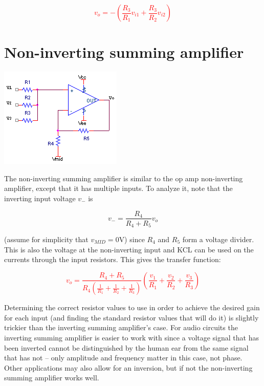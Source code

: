 \textcolor{red}{
\begin{equation}
v_{o} = -\left(\frac{R_{3}}{R_{1}}v_{i1} + \frac{R_{3}}{R_{2}}v_{i2}\right)
\label{eq:invertingsummingamplifier}
\end{equation}
}


\section{Non-inverting summing amplifier}
\begin{center}
	\includegraphics{schematics/summingamp.PNG}
\end{center}
The non-inverting summing amplifier is similar to the op amp non-inverting amplifier, except that it has multiple inputs. To analyze it, note that the inverting input voltage $v_{-}$ is

\begin{equation}
v_{-} = \frac{R_{4}}{R_{4}+R_{5}}v_{o}
\end{equation}

\noindent (assume for simplicity that $v_{MID} = 0$V) since $R_{4}$ and $R_{5}$ form a voltage divider. This is also the voltage at the non-inverting input and KCL can be used on the currents through the input resistors. This gives the transfer function:

\textcolor{red}{
\begin{equation}
v_{o} = \frac{R_{4}+R_{5}}{R_{4}\left(\frac{1}{R_{1}} + \frac{1}{R_{2}} + \frac{1}{R_{3}}\right)}\left(\frac{v_{1}}{R_{1}} + \frac{v_{2}}{R_{2}} + \frac{v_{3}}{R_{3}}\right)
\label{eq:summingamp}
\end{equation}
}

Determining the correct resistor values to use in order to achieve the desired gain for each input (and finding the standard resistor values that will do it) is slightly trickier than the inverting summing amplifier's case. For audio circuits the inverting summing amplifier is easier to work with since a voltage signal that has been inverted cannot be distinguished by the human ear from the same signal that has not -- only amplitude and frequency matter in this case, not phase. Other applications may also allow for an inversion, but if not the non-inverting summing amplifier works well.


